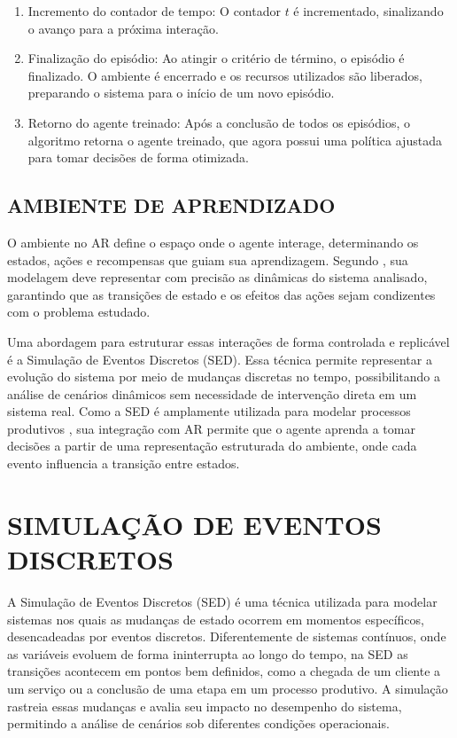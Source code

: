 \documentclass[
    12pt,                %
    openright,           %
    oneside,             %
    a4paper,             %
    english,             %
    spanish,             %
    brazil               %
]{ufscar}
\begin{document}
\begin{enumerate}
    \item Incremento do contador de tempo: O contador \( t \) é incrementado, sinalizando o avanço para a próxima interação.
    
    \item Finalização do episódio: Ao atingir o critério de término, o episódio é finalizado. O ambiente é encerrado e os recursos utilizados são liberados, preparando o sistema para o início de um novo episódio.
    
    \item Retorno do agente treinado: Após a conclusão de todos os episódios, o algoritmo retorna o agente treinado, que agora possui uma política ajustada para tomar decisões de forma otimizada.
\end{enumerate}

\subsection{AMBIENTE DE APRENDIZADO}

O ambiente no AR define o espaço onde o agente interage, determinando os estados, ações e recompensas que guiam sua aprendizagem. Segundo \cite{sutton_reinforcement_2014}, sua modelagem deve representar com precisão as dinâmicas do sistema analisado, garantindo que as transições de estado e os efeitos das ações sejam condizentes com o problema estudado.

Uma abordagem para estruturar essas interações de forma controlada e replicável é a Simulação de Eventos Discretos (SED). Essa técnica permite representar a evolução do sistema por meio de mudanças discretas no tempo, possibilitando a análise de cenários dinâmicos sem necessidade de intervenção direta em um sistema real. Como a SED é amplamente utilizada para modelar processos produtivos \cite{banks_discrete-event_2010}, sua integração com AR permite que o agente aprenda a tomar decisões a partir de uma representação estruturada do ambiente, onde cada evento influencia a transição entre estados.

\section{SIMULAÇÃO DE EVENTOS DISCRETOS}

A Simulação de Eventos Discretos (SED) é uma técnica utilizada para modelar sistemas nos quais as mudanças de estado ocorrem em momentos específicos, desencadeadas por eventos discretos. Diferentemente de sistemas contínuos, onde as variáveis evoluem de forma ininterrupta ao longo do tempo, na SED as transições acontecem em pontos bem definidos, como a chegada de um cliente a um serviço ou a conclusão de uma etapa em um processo produtivo. A simulação rastreia essas mudanças e avalia seu impacto no desempenho do sistema, permitindo a análise de cenários sob diferentes condições operacionais.
\end{document}

